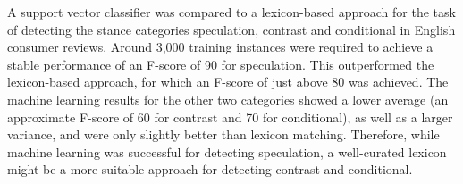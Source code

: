 A support vector classifier was compared to a lexicon-based approach for the task of detecting the stance categories speculation, contrast and conditional in English consumer reviews. Around 3,000 training instances were required to achieve a stable performance of an F-score of 90 for speculation. This outperformed the lexicon-based approach, for which an F-score of just above 80 was achieved. The machine learning results for the other two categories showed a lower average (an approximate F-score of 60 for contrast and 70 for conditional), as well as a larger variance, and were only slightly better than lexicon matching. Therefore, while machine learning was successful for detecting speculation, a well-curated lexicon might be a more suitable approach for detecting contrast and conditional.
